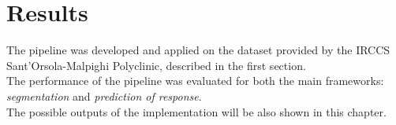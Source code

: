 \documentclass{standalone}
\begin{document}
\chapter{Results}
The pipeline was developed and applied on the dataset provided by the IRCCS Sant’Orsola-Malpighi Polyclinic, described in the first section.
\\
The performance of the pipeline was evaluated for both the main frameworks: \textit{segmentation} and \textit{prediction of response}.
\\
The possible outputs of the implementation will be also shown in this chapter.
\end{document}
